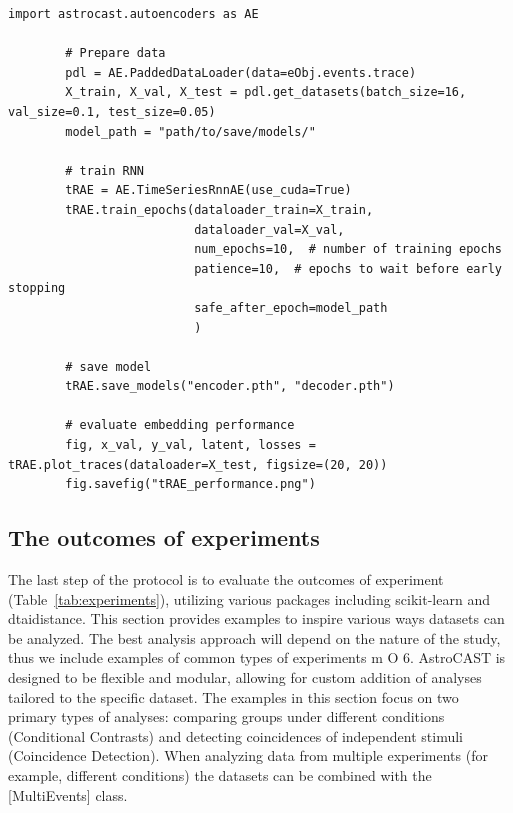 \documentclass[utf8]{FrontiersinHarvard}
\newcommand{\inlineBash}[1]{%
    \begingroup
    \edef\temp{#1}%
    \expandafter\StrSubstitute\expandafter{\temp}{--}{-{-}}[\temp]%
    \tcbox[on line, boxsep=0pt, left=1pt, right=1pt, top=1pt, bottom=1pt,
        boxrule=0pt, arc=0pt, outer arc=0pt, colback=lightgray]{
        \texttt{\small \temp}
    }%
    \endgroup
}
\newcommand{\inlinepy}[1]{\inlineBash{#1}}
\newcommand{\fref}{ m O{} }{ (Figure~\ref{fig:#1}\IfValueT{#2}{\,#2})}
\newcommand{\tref}[1]{ (Table~\ref{tab:#1})}
\begin{document}
    \begin{lstlisting}[style=pyStyle]
        import astrocast.autoencoders as AE

        # Prepare data
        pdl = AE.PaddedDataLoader(data=eObj.events.trace)
        X_train, X_val, X_test = pdl.get_datasets(batch_size=16, val_size=0.1, test_size=0.05)
        model_path = "path/to/save/models/"

        # train RNN
        tRAE = AE.TimeSeriesRnnAE(use_cuda=True)
        tRAE.train_epochs(dataloader_train=X_train,
                          dataloader_val=X_val,
                          num_epochs=10,  # number of training epochs
                          patience=10,  # epochs to wait before early stopping
                          safe_after_epoch=model_path
                          )

        # save model
        tRAE.save_models("encoder.pth", "decoder.pth")

        # evaluate embedding performance
        fig, x_val, y_val, latent, losses = tRAE.plot_traces(dataloader=X_test, figsize=(20, 20))
        fig.savefig("tRAE_performance.png")
    \end{lstlisting}

    \subsection{The outcomes of experiments}

    The last step of the protocol is to evaluate the outcomes of experiment\tref{experiments}, utilizing various packages including scikit-learn and dtaidistance\citep{pedregosa_scikit-learn_2011,meert_wannes_dtaidistance_2020,mcinnes_umap_2018,mcinnes_hdbscan_2017}. This section provides examples to inspire various ways datasets can be analyzed. The best analysis approach will depend on the nature of the study, thus we include examples of common types of experiments\fref{6}. AstroCAST is designed to be flexible and modular, allowing for custom addition of analyses tailored to the specific dataset. The examples in this section focus on two primary types of analyses: comparing groups under different conditions (Conditional Contrasts) and detecting coincidences of independent stimuli (Coincidence Detection). When analyzing data from multiple experiments (for example, different conditions) the datasets can be combined with the \inlinepy{MultiEvents} class.
\end{document}
